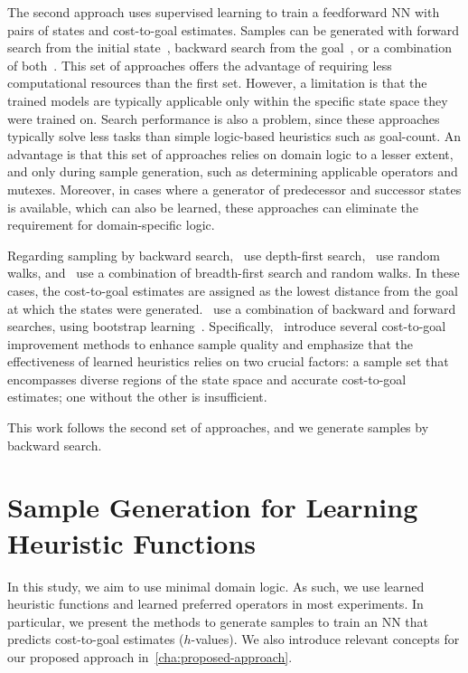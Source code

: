 \documentclass[ppgc,diss,english]{iiufrgs}
\newcommand{\pp}[2][noinline]{\todo[color=purple!50,linecolor={purple!100},#1,fancyline,author=Pedro]{#2}}
\begin{document}
The second approach uses supervised learning to train a feedforward NN with pairs of states and cost-to-goal estimates. Samples can be generated with forward search from the initial state~\cite{Ferber.etal/2020a}, backward search from the goal~\cite{Yu.etal/2020,OToole/2022,Bettker.etal/2022}, or a combination of both~\cite{Ferber.etal/2022}.
This set of approaches offers the advantage of requiring less computational resources than the first set. However, a limitation is that the trained models are typically applicable only within the specific state space they were trained on. Search performance is also a problem, since these approaches typically solve less tasks than simple logic-based heuristics such as goal-count. An advantage is that this set of approaches relies on domain logic to a lesser extent, and only during sample generation, such as determining applicable operators and mutexes. Moreover, in cases where a generator of predecessor and successor states is available, which can also be learned, these approaches can eliminate the requirement for domain-specific logic.%

Regarding sampling by backward search,~\citet{Yu.etal/2020} use depth-first search,~\citet{OToole/2022} use random walks, and~\citet{Bettker.etal/2022} use a combination of breadth-first search and random walks. In these cases, the cost-to-goal estimates are assigned as the lowest distance from the goal at which the states were generated.~\citet{Ferber.etal/2022} use a combination of backward and forward searches, using bootstrap learning~\cite{Arfaee.etal/2011}.
Specifically,~\citet{Bettker.etal/2022} introduce several cost-to-goal improvement methods to enhance sample quality and emphasize that the effectiveness of learned heuristics relies on two crucial factors: a sample set that encompasses diverse regions of the state space and accurate cost-to-goal estimates; one without the other is insufficient.

This work follows the second set of approaches, and we generate samples by backward search.


%
%
\chapter{Sample Generation for Learning Heuristic Functions}
\label{cha:sample-gen-h}
In this study, we aim to use minimal domain logic. As such, we use learned heuristic functions and learned preferred operators in most experiments. In particular, we present the methods to generate samples to train an NN that predicts cost-to-goal estimates ($h$-values). We also introduce relevant concepts for our proposed approach in~\cref{cha:proposed-approach}.
\end{document}
